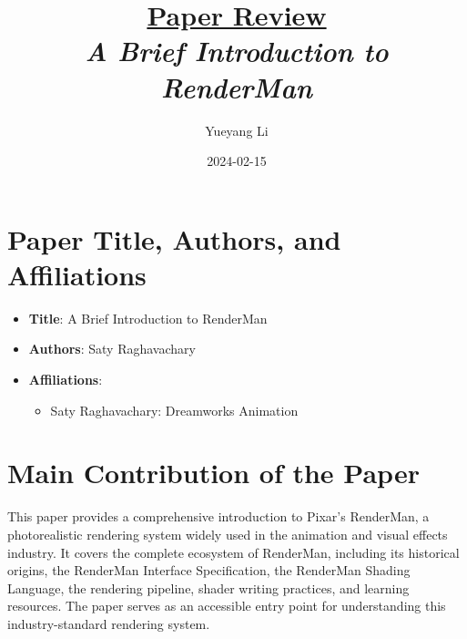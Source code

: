 \documentclass[12pt]{article}
\newcommand{\paperTitle}{
    \textit{\normalsize{A Brief Introduction to RenderMan}}
}
\begin{document}
\title{\Large\uline{\textbf{Paper Review}} \\[0.4em]
\paperTitle{} 
}
\author{Yueyang Li}
\date{2024-02-15}

\maketitle

\section{Paper Title, Authors, and Affiliations}
\begin{itemize}[noitemsep]
    \item \textbf{Title}: A Brief Introduction to RenderMan
    \item \textbf{Authors}: Saty Raghavachary
    \item \textbf{Affiliations}:
    \begin{itemize}[noitemsep]
        \item Saty Raghavachary: Dreamworks Animation
    \end{itemize}
\end{itemize}

\section{Main Contribution of the Paper}
This paper provides a comprehensive introduction to Pixar's RenderMan, a photorealistic rendering system widely used in the animation and visual effects industry. It covers the complete ecosystem of RenderMan, including its historical origins, the RenderMan Interface Specification, the RenderMan Shading Language, the rendering pipeline, shader writing practices, and learning resources. The paper serves as an accessible entry point for understanding this industry-standard rendering system.
\end{document}
